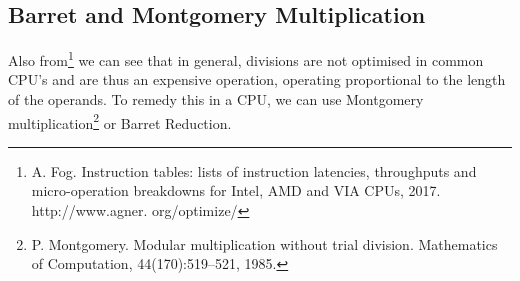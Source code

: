 \subsection{Barret and Montgomery Multiplication}%
\label{sub:Barret and Montgomery Multiplication}

Also from\footnote{A. Fog. Instruction tables: lists of instruction latencies, throughputs and micro-operation breakdowns for Intel, AMD and VIA CPUs, 2017. http://www.agner. org/optimize/} we can see that in general, divisions are not optimised in common CPU's and are thus an expensive operation, operating proportional to the length of the operands. To remedy this in a CPU, we can use Montgomery multiplication\footnote{P. Montgomery. Modular multiplication without trial division. Mathematics of Computation, 44(170):519–521, 1985.} or Barret Reduction.
